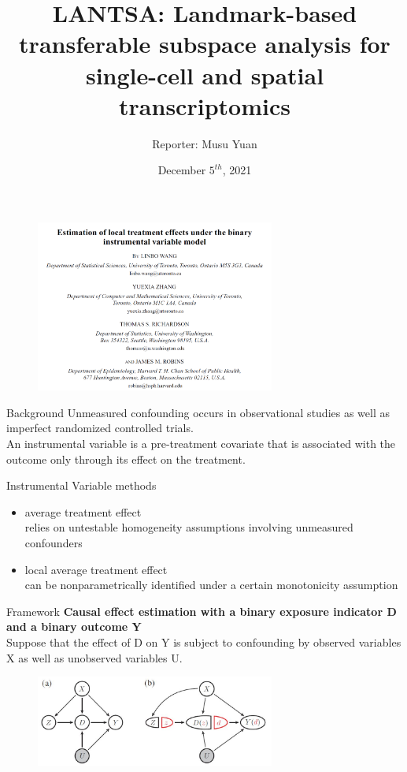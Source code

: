 \documentclass[aspectratio=169,xcolor=dvipsnames]{beamer}
\title[short title]{LANTSA: Landmark-based transferable subspace analysis for
single-cell and spatial transcriptomics}
\subtitle{}
\author[Pin-Yen] {Reporter: Musu Yuan}
\institute[NTU] %
{
    CQB, AAIS, Peking University, Beijing
    \vskip 3pt
}
\date{December $5^{th}$, 2021} %
\begin{document}
\begin{frame}
\begin{figure}
    \centering
    \includegraphics[width=0.7\textwidth]{figure/fig1.PNG}
\end{figure}
\end{frame}

\begin{frame}{Background}
Unmeasured confounding occurs in observational studies as well as imperfect randomized controlled trials.\vspace{8pt}\\
An instrumental variable is a pre-treatment covariate that is associated with the outcome only through its effect on the treatment.
\end{frame}

\begin{frame}{Instrumental Variable methods}
  \begin{itemize}
      \item average treatment effect\\ \quad relies on untestable homogeneity assumptions involving unmeasured confounders\vspace{8pt}
      \item local average treatment effect\\ \quad can be nonparametrically identified under a certain monotonicity
assumption
  \end{itemize} 
\end{frame}

\begin{frame}{Framework}
\textbf{Causal effect estimation with a binary exposure indicator D and a binary outcome Y} \vspace{8pt}\\
Suppose that the effect of D on Y is subject to confounding by observed variables X as well as unobserved variables U.\\
\begin{figure}
    \centering
    \includegraphics[width=0.7\textwidth]{figure/fig2.JPG}
\end{figure}
\end{frame}
\end{document}
